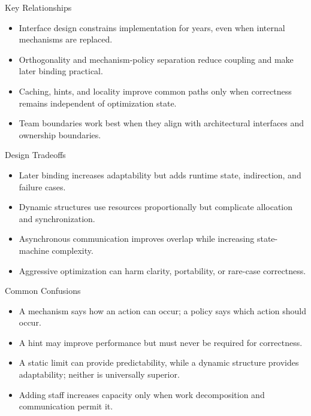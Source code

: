 \documentclass[10pt,letterpaper]{article}
\begin{document}
\begin{studybox}{Key Relationships}
\begin{itemize}
  \item Interface design constrains implementation for years, even when internal mechanisms are replaced.
  \item Orthogonality and mechanism-policy separation reduce coupling and make later binding practical.
  \item Caching, hints, and locality improve common paths only when correctness remains independent of optimization state.
  \item Team boundaries work best when they align with architectural interfaces and ownership boundaries.
\end{itemize}
\end{studybox}

\begin{studybox}{Design Tradeoffs}
\begin{itemize}
  \item Later binding increases adaptability but adds runtime state, indirection, and failure cases.
  \item Dynamic structures use resources proportionally but complicate allocation and synchronization.
  \item Asynchronous communication improves overlap while increasing state-machine complexity.
  \item Aggressive optimization can harm clarity, portability, or rare-case correctness.
\end{itemize}
\end{studybox}

\begin{studybox}{Common Confusions}
\begin{itemize}
  \item A mechanism says how an action can occur; a policy says which action should occur.
  \item A hint may improve performance but must never be required for correctness.
  \item A static limit can provide predictability, while a dynamic structure provides adaptability; neither is universally superior.
  \item Adding staff increases capacity only when work decomposition and communication permit it.
\end{itemize}
\end{studybox}
\end{document}
